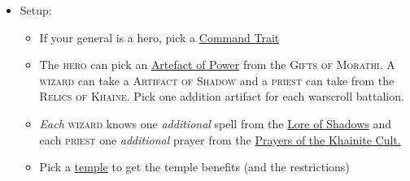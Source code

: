 

\begin{itemize}
\item Setup: 
    \begin{itemize}
        \item If your general is a hero, pick
            a \hyperref[command-traits]{Command Trait}
        \item The \textsc{hero } can pick an
            \hyperref[artefacts-of-power]{Artefact of Power} from the
            \textsc{Gifts of Morathi}. A \textsc{wizard} can take
            a \textsc{Artifact of Shadow} and a \textsc{priest} can take from
            the \textsc{Relics of Khaine}. Pick one addition artifact for each
            warscroll battalion.
        \item \emph{Each} \textsc{wizard} knows one \emph{additional} spell
            from the \hyperref[lore-of-shadows]{Lore of Shadows} and each
            \textsc{priest} one \emph{additional} prayer from the
            \hyperref[prayers-of-the-khainite-cult]{Prayers of the Khainite
            Cult.}
        \item Pick a \hyperref[temple]{temple} to get the temple benefits (and
            the restrictions)
    \end{itemize}



\end{itemize}
